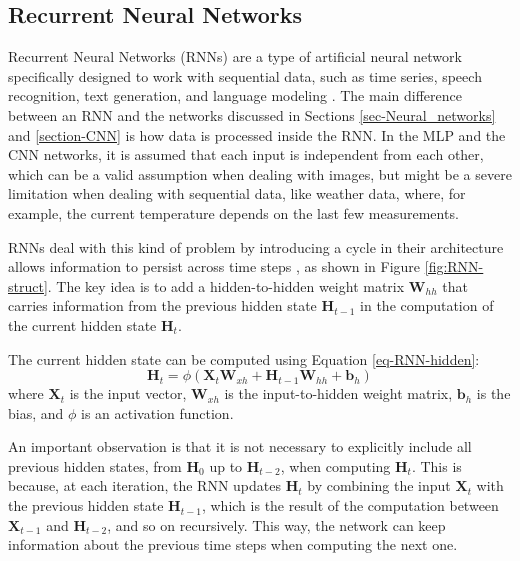 \subsection{Recurrent Neural Networks} \label{section-RNN}

Recurrent Neural Networks (RNNs) are a type of artificial neural network specifically designed to work with sequential data, such as time series, speech recognition, text generation, and language modeling \cite{schmidt2019recurrentneuralnetworksrnns,fang-wei,Alzubaidi_Zhang_Humaidi_Al_Dujaili_Duan_Al_Shamma_Santamaria_Fadhel_Al_Amidie_Farhan_2021}. The main difference between an RNN and the networks discussed in Sections \ref{sec-Neural_networks} and \ref{section-CNN} is how data is processed inside the RNN. In the MLP and the CNN networks, it is assumed that each input is independent from each other, which can be a valid assumption when dealing with images, but might be a severe limitation when dealing with sequential data, like weather data, where, for example, the current temperature depends on the last few measurements.

RNNs deal with this kind of problem by introducing a cycle in their architecture  allows information to persist across time steps \cite{schmidt2019recurrentneuralnetworksrnns}, as shown in Figure \ref{fig:RNN-struct}. The key idea is to add a hidden-to-hidden weight matrix $\boldsymbol{W}_{hh}$ that carries information from the previous hidden state $\boldsymbol{H}_{t-1}$ in the computation of the current hidden state $\boldsymbol{H}_t$. 

The current hidden state can be computed using Equation \ref{eq-RNN-hidden}:
\begin{equation}
    \boldsymbol{H}_t = \phi(\boldsymbol{X}_t \boldsymbol{W}_{xh} + \boldsymbol{H}_{t-1} \boldsymbol{W}_{hh} + \boldsymbol{b}_h)
    \label{eq-RNN-hidden}
\end{equation}
where $\boldsymbol{X}_t$ is the input vector, $\boldsymbol{W}_{xh}$ is the input-to-hidden weight matrix, $\boldsymbol{b}_h$ is the bias, and $\phi$ is an activation function. 

An important observation is that it is not necessary to explicitly include all previous hidden states, from $\boldsymbol{H}_{0}$ up to $\boldsymbol{H}_{t-2}$, when computing $\boldsymbol{H}_t$. This is because, at each iteration, the RNN updates $\boldsymbol{H}_{t}$ by combining the input $\boldsymbol{X}_t$ with the previous hidden state $\boldsymbol{H}_{t-1}$, which is the result of the computation between $\boldsymbol{X}_{t-1}$ and $\boldsymbol{H}_{t-2}$, and so on recursively. This way, the network can keep information about the previous time steps when computing the next one.

